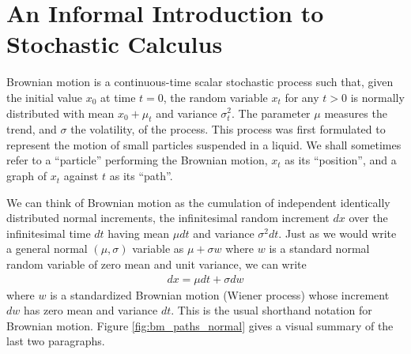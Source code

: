 \documentclass[\topdir/lecture\_notes.tex]{subfiles}
\begin{document}
\section{An Informal Introduction to Stochastic Calculus}
Brownian motion is a continuous-time scalar stochastic process such that, given the initial value \(x_{0}\) at time \(t=0\), the random variable \(x_{t}\) for any \(t>0\) is normally distributed with mean \(x_{0}+\mu_t\) and variance \(\sigma^{2}_t\). The parameter \(\mu\) measures the trend, and \(\sigma\) the volatility, of the process. This process was first formulated to represent the motion of small particles suspended in a liquid. We shall sometimes refer to a ``particle'' performing the Brownian motion, \(x_{t}\) as its ``position'', and a graph of \(x_{t}\) against \(t\) as its ``path''.

We can think of Brownian motion as the cumulation of independent identically distributed normal increments, the infinitesimal random increment \(dx\) over the infinitesimal time \(dt\) having mean \(\mu dt\) and variance \(\sigma^{2} dt\). Just as we would write a general normal \((\mu, \sigma)\) variable as \(\mu+\sigma w\) where \(w\) is a standard normal random variable of zero mean and unit variance, we can write
\begin{align}
dx=\mu dt+\sigma dw \label{eq:brownian_motion}
\end{align}
where \(w\) is a standardized Brownian motion (Wiener process) whose increment \(dw\) has zero mean and variance \(dt\). This is the usual shorthand notation for Brownian motion. Figure \ref{fig:bm_paths_normal} gives a visual summary of the last two paragraphs.
\end{document}
